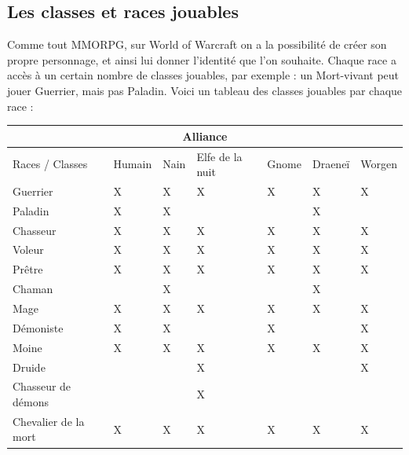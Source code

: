 \documentclass{article}
\begin{document}
\subsection{Les classes et races jouables}

Comme tout MMORPG, sur World of Warcraft on a la possibilité de créer son propre
personnage, et ainsi lui donner l'identité que l'on souhaite.\newline
Chaque race a accès à un certain nombre de classes jouables, par exemple : un Mort-vivant
peut jouer Guerrier, mais pas Paladin.\newline\newline
Voici un tableau des classes jouables par chaque race :

\begin{tabular}{|m{2cm}||m{1cm}|m{1cm}|m{1cm}|m{1cm}|m{1cm}|m{1cm}|}
    \hline
    \multicolumn{7}{|c|}{Alliance}                                                    \\
    \hline
    \hline
    Races / Classes      & Humain & Nain & Elfe de la nuit & Gnome & Draeneï & Worgen \\
    \hline
    \hline
    Guerrier             & X      & X    & X               & X     & X       & X      \\
    \hline
    Paladin              & X      & X    &                 &       & X       &        \\
    \hline
    Chasseur             & X      & X    & X               & X     & X       & X      \\
    \hline
    Voleur               & X      & X    & X               & X     & X       & X      \\
    \hline
    Prêtre               & X      & X    & X               & X     & X       & X      \\
    \hline
    Chaman               &        & X    &                 &       & X       &        \\
    \hline
    Mage                 & X      & X    & X               & X     & X       & X      \\
    \hline
    Démoniste            & X      & X    &                 & X     &         & X      \\
    \hline
    Moine                & X      & X    & X               & X     & X       & X      \\
    \hline
    Druide               &        &      & X               &       &         & X      \\
    \hline
    Chasseur de démons   &        &      & X               &       &         &        \\
    \hline
    Chevalier de la mort & X      & X    & X               & X     & X       & X      \\
    \hline
\end{tabular}\bigskip
\end{document}
